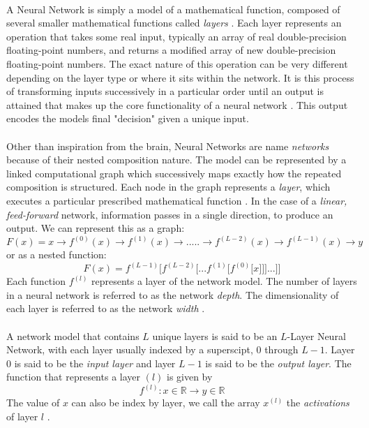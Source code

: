 \documentclass[12pt,letterpaper]{article}
\begin{document}
\paragraph*{}A Neural Network is simply a model of a mathematical function, composed of several smaller mathematical functions called \textit{layers} \cite{Goodfellow,Loy}. Each layer represents an operation that takes some real input, typically an array of real double-precision floating-point numbers, and returns a modified array of new double-precision floating-point numbers. The exact nature of this operation can be very different depending on the layer type or where it sits within the network. It is this process of transforming inputs successively in a particular order until an output is attained that makes up the core functionality of a neural network \cite{Geron,Loy}. This output encodes the models final "decision" given a unique input.

\paragraph*{}Other than inspiration from the brain, Neural Networks are name \textit{networks} because of their nested composition nature. The model can be represented by a linked computational graph which successively maps exactly how the repeated composition is structured. Each node in the graph represents a \textit{layer}, which executes a particular prescribed mathematical function \cite{Goodfellow}. In the case of a \textit{linear, feed-forward} network, information passes in a single direction, to produce an output. We can represent this as a graph:
\begin{equation}
\label{eqn-FunctionGraph}
F(x) = x \rightarrow f^{(0)}(x) \rightarrow f^{(1)}(x) \rightarrow ..... \rightarrow
f^{(L-2)}(x) \rightarrow f^{(L-1)}(x) \rightarrow y
\end{equation}
or as a nested function:
\begin{equation}
\label{eqn-FunctionChain}
F(x) = f^{(L-1)}\big[f^{(L-2)}\big[...f^{(1)}\big[f^{(0)}\big[x]\big]\big]...\big]\big]
\end{equation}
Each function $f^{(l)}$ represents a layer of the network model. The number of layers in a neural network is referred to as the network \textit{depth}. The dimensionality of each layer is referred to as the network \textit{width} \cite{Geron,Loy}.

\paragraph*{}A network model that contains $L$ unique layers is said to be an $L$-Layer Neural Network, with each layer usually indexed by a superscipt, $0$ through $L-1$. Layer $0$ is said to be the \textit{input layer} and layer $L-1$ is said to be the \textit{output layer}. The function that represents a layer $(l)$ is given by 
\begin{equation}
\label{eqn-LayerFunction}
f^{(l)} : x \in \mathbb{R} \rightarrow y \in \mathbb{R}
\end{equation}
The value of $x$ can also be index by layer, we call the array $x^{(l)}$ the \textit{activations} of layer $l$ \cite{Goodfellow,Loy}. 
\end{document}
